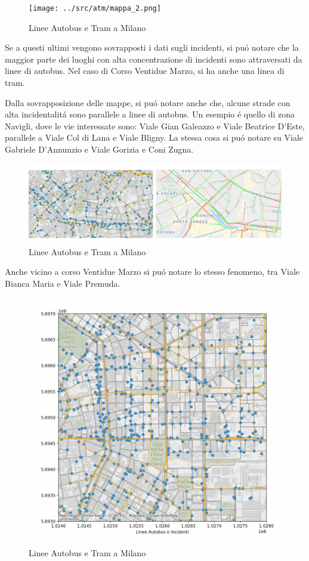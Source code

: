 \documentclass[a4paper]{report}
\begin{document}
\begin{figure}[!ht]
    \texttt{[image: ../src/atm/mappa\_2.png]}
    \caption{Linee Autobus e Tram a Milano}
    \label{fig:geo_trasporti}
\end{figure}

Se a questi ultimi vengono sovrapposti i dati sugli incidenti, 
si pu\'o notare che la maggior parte dei luoghi con alta concentrazione di incidenti sono 
attraversati da linee di autobus. Nel caso di Corso Ventidue Marzo, si ha anche una linea di tram.




Dalla sovrapposizione delle mappe, si pu\'o notare anche che, alcune strade con alta incidentalit\'a 
sono parallele a linee di autobus. Un esempio \'e quello di zona Navigli, 
dove le vie interessate sono:
Viale Gian Galeazzo e Viale Beatrice D'Este, parallele a Viale Col di Lana e Viale Bligny.
La stessa cosa si pu\'o notare su Viale Gabriele D'Annunzio e Viale Gorizia e Coni Zugna.

\begin{figure}[!ht]
    \includegraphics[width=\linewidth]{../src/atm/navigli.png}
    \caption{Linee Autobus e Tram a Milano}
    \label{fig:navigli}
\end{figure}

Anche vicino a corso Ventidue Marzo si pu\'o notare lo stesso fenomeno, 
tra Viale Bianca Maria e Viale Premuda.

\begin{figure}[!ht]
    \includegraphics[width=\linewidth]{../src/atm/22_marzo.png}
    \caption{Linee Autobus e Tram a Milano}
    \label{fig:22_marzo}
\end{figure}
\end{document}

